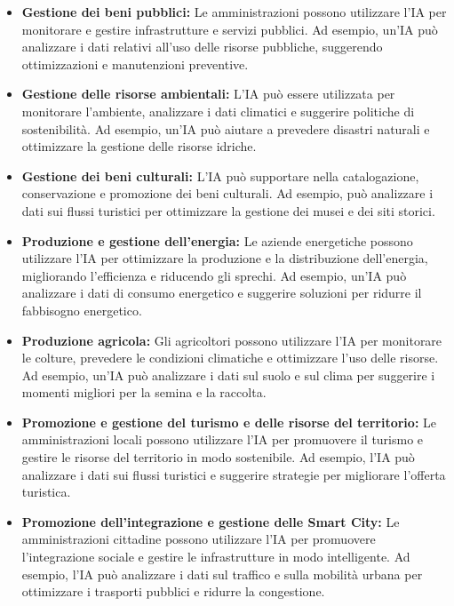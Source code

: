         \begin{itemize}
            \item \textbf{Gestione dei beni pubblici:} Le amministrazioni possono utilizzare l'IA per monitorare e gestire infrastrutture e servizi pubblici. Ad esempio, un'IA può analizzare i dati relativi all'uso delle risorse pubbliche, suggerendo ottimizzazioni e manutenzioni preventive.
    
            \item \textbf{Gestione delle risorse ambientali:} L'IA può essere utilizzata per monitorare l'ambiente, analizzare i dati climatici e suggerire politiche di sostenibilità. Ad esempio, un'IA può aiutare a prevedere disastri naturali e ottimizzare la gestione delle risorse idriche.
            
            \item \textbf{Gestione dei beni culturali:} L'IA può supportare nella catalogazione, conservazione e promozione dei beni culturali. Ad esempio, può analizzare i dati sui flussi turistici per ottimizzare la gestione dei musei e dei siti storici.
            
            \item \textbf{Produzione e gestione dell'energia:} Le aziende energetiche possono utilizzare l'IA per ottimizzare la produzione e la distribuzione dell'energia, migliorando l'efficienza e riducendo gli sprechi. Ad esempio, un'IA può analizzare i dati di consumo energetico e suggerire soluzioni per ridurre il fabbisogno energetico.
            
            \item \textbf{Produzione agricola:} Gli agricoltori possono utilizzare l'IA per monitorare le colture, prevedere le condizioni climatiche e ottimizzare l'uso delle risorse. Ad esempio, un'IA può analizzare i dati sul suolo e sul clima per suggerire i momenti migliori per la semina e la raccolta.
            
            \item \textbf{Promozione e gestione del turismo e delle risorse del territorio:} Le amministrazioni locali possono utilizzare l'IA per promuovere il turismo e gestire le risorse del territorio in modo sostenibile. Ad esempio, l'IA può analizzare i dati sui flussi turistici e suggerire strategie per migliorare l'offerta turistica.
            
            \item \textbf{Promozione dell'integrazione e gestione delle Smart City:} Le amministrazioni cittadine possono utilizzare l'IA per promuovere l'integrazione sociale e gestire le infrastrutture in modo intelligente. Ad esempio, l'IA può analizzare i dati sul traffico e sulla mobilità urbana per ottimizzare i trasporti pubblici e ridurre la congestione.
        \end{itemize}
